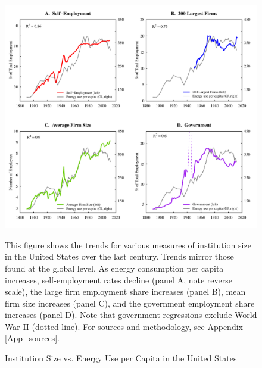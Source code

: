 \begin{figure}
	
	\centerline{\includegraphics[scale=1]{Fig2}}
	
	\caption{Institution Size vs. Energy Use per Capita in the United  States\label{Fig_US_inst}}
	
	\small
	\smallskip
	
	This figure shows the trends for various measures of institution size in the United States over the last century. Trends mirror those found at the global level. As energy consumption per capita increases, self-employment rates decline (panel A, note reverse scale), the large firm employment share increases (panel B), mean firm size increases (panel C), and the government employment share increases (panel D). Note that government regressions exclude World War II (dotted line). For sources and methodology, see Appendix \ref{App_sources}.
	
	\bigskip
	
\end{figure}


